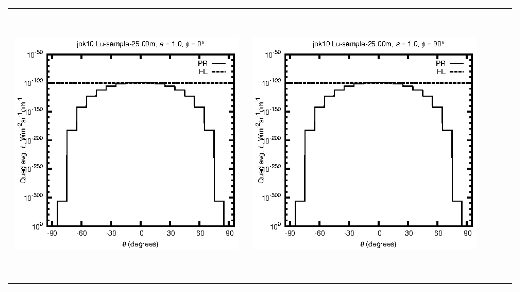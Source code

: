 \begin{tabular}{c c c c}
\includegraphics[height=7cm]{../eps/jok10_Lu_sample_25.00m_fwd.eps} &
\includegraphics[height=7cm]{../eps/jok10_Lu_sample_25.00m_cross.eps} \\
\end{tabular}

\pagebreak

